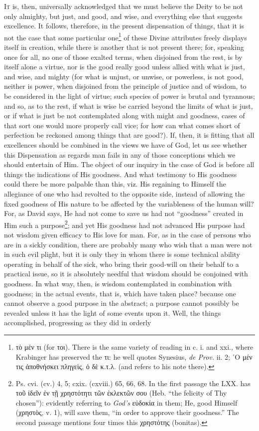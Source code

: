 \textsc{It} is, then, universally acknowledged that we must believe the Deity to be not only almighty, but just, and good, and wise, and everything else that suggests excellence. It follows, therefore, in the present dispensation of things, that it is not the case that some particular one\footnote{\textgreek{τὸ μέν τι} (for \textgreek{τοι}). There is the same variety of reading in c. i. and xxi., where Krabinger has preserved the \textgreek{τι}: he well quotes Synesius, \emph{de Prov.} ii. 2; \textgreek{῾Ο μέν τις ἀποθνήσκει πληγεὶς, ὁ δὲ κ.τ.λ}. (and refers to his note there).} of these Divine attributes freely displays itself in creation, while there is another that is not present there; for, speaking once for all, no one of those exalted terms, when disjoined from the rest, is by itself alone a virtue, nor is the good really good unless allied with what is just, and wise, and mighty (for what is unjust, or unwise, or powerless, is not good, neither is power, when disjoined from the principle of justice and of wisdom, to be considered in the light of virtue; such species of power is brutal and tyrannous; and so, as to the rest, if what is wise be carried beyond the limits of what is just, or if what is just be not contemplated along with might and goodness, cases of that sort one would more properly call vice; for how can what comes short of perfection be reckoned among things that are good?). If, then, it is fitting that all excellences should be combined in the views we have of God, let us see whether this Dispensation as regards man fails in any of those conceptions which we should entertain of Him. The object of our inquiry in the case of God is before all things the indications of His goodness. And what testimony to His goodness could there be more palpable than this, viz. His regaining to Himself the allegiance of one who had revolted to the opposite side, instead of allowing the fixed goodness of His nature to be affected by the variableness of the human will? For, as David says, He had not come to save us had not “goodness” created in Him such a purpose\footnote{Ps. cvi. (cv.) 4, 5; cxix. (cxviii.) 65, 66, 68. In the first passage the LXX. has \textgreek{τοῦ ἰδεῖν ἐν τῇ χρηστότητι τῶν ἐκλεκτῶν σου} (Heb. “the felicity of Thy chosen”): evidently referring to \emph{God’s} \textgreek{εὐδοκία} in them; He, good Himself (\textgreek{χρηστὸς}, v. 1), will save them, “in order to approve their goodness.” The second passage mentions four times this \textgreek{χρηστότης} (bonitas).}; and yet His goodness had not advanced His purpose had not wisdom given efficacy to His love for man. For, as in the case of persons who are in a sickly condition, there are probably many who wish that a man were not in such evil plight, but it is only they in whom there is some technical ability operating in behalf of the sick, who bring their good-will on their behalf to a practical issue, so it is absolutely needful that wisdom should be conjoined with goodness. In what way, then, is wisdom contemplated in combination with goodness; in the actual events, that is, which have taken place? because one cannot observe a good purpose in the abstract; a purpose cannot possibly be revealed unless it has the light of some events upon it. Well, the things accomplished, progressing as they did in orderly 